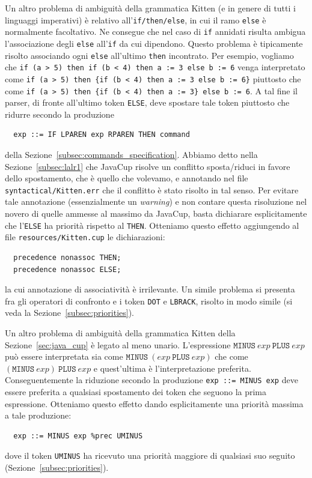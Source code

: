 Un altro problema di ambiguit\`a della grammatica Kitten (e in genere di
tutti i linguaggi imperativi) \`e relativo
all'\texttt{if/then/else}, in cui il ramo \texttt{else} \`e normalmente
facoltativo. Ne consegue che nel caso di \texttt{if} annidati risulta ambigua
l'associazione degli \texttt{else} all'\texttt{if} da cui dipendono.
Questo problema \`e tipicamente risolto associando
ogni \texttt{else} all'ultimo \texttt{then} incontrato. Per esempio,
vogliamo che
\texttt{if (a > 5) then if (b < 4) then a := 3 else b := 6}
venga interpretato come
\texttt{if (a > 5) then \{if (b < 4) then a := 3 else b := 6\}}
piuttosto che come
\texttt{if (a > 5) then \{if (b < 4) then a := 3\} else b := 6}.
A tal fine il parser, di fronte all'ultimo token \texttt{ELSE},
deve spostare tale token piuttosto che ridurre secondo la produzione
%
\begin{verbatim}
  exp ::= IF LPAREN exp RPAREN THEN command
\end{verbatim}
%
della Sezione~\ref{subsec:commands_specification}.
Abbiamo detto nella Sezione~\ref{subsec:lalr1} che
JavaCup risolve un conflitto sposta/riduci in favore dello spostamento,
che \`e quello che volevamo, e annotando nel
file \texttt{syntactical/Kitten.err} che il conflitto \`e stato risolto in
tal senso. Per evitare tale annotazione (essenzialmente un \emph{warning})
e non contare questa risoluzione nel novero di quelle ammesse al massimo
da JavaCup, basta dichiarare esplicitamente che l'\texttt{ELSE} ha priorit\`a
rispetto al \texttt{THEN}. Otteniamo questo effetto aggiungendo al file
\texttt{resources/Kitten.cup} le dichiarazioni:
%
\begin{verbatim}
  precedence nonassoc THEN;
  precedence nonassoc ELSE;
\end{verbatim}
%
la cui annotazione di associativit\`a \`e irrilevante.
Un simile problema si presenta fra gli operatori di confronto e i token
\texttt{DOT} e \texttt{LBRACK}, risolto in modo simile (si veda la
Sezione~\ref{subsec:priorities}).

Un altro problema di ambiguit\`a della grammatica Kitten della
Sezione~\ref{sec:java_cup} \`e legato al meno unario. L'espressione
$\mathtt{MINUS}\ \mathit{exp}\ \mathtt{PLUS}\ \mathit{exp}$ pu\`o
essere interpretata sia come
$\mathtt{MINUS}\ (\mathit{exp}\ \mathtt{PLUS}\ \mathit{exp})$ che come
$(\mathtt{MINUS}\ \mathit{exp})\ \mathtt{PLUS}\ \mathit{exp}$ e quest'ultima
\`e l'interpretazione preferita. Conseguentemente la riduzione
secondo la produzione \texttt{exp ::= MINUS exp} deve essere preferita
a qualsiasi spostamento dei token che seguono la prima espressione.
Otteniamo questo effetto dando esplicitamente una priorit\`a massima a tale
produzione:
%
\begin{verbatim}
  exp ::= MINUS exp %prec UMINUS
\end{verbatim}
%
dove il token \texttt{UMINUS} ha ricevuto una priorit\`a maggiore di qualsiasi
suo seguito (Sezione~\ref{subsec:priorities}).

